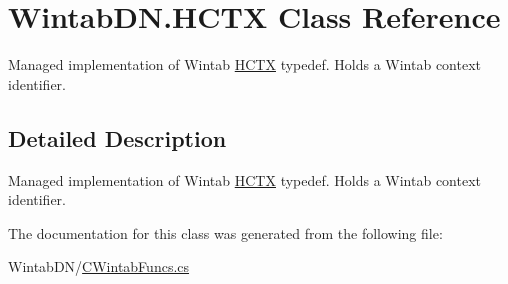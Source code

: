 \hypertarget{class_wintab_d_n_1_1_h_c_t_x}{}\section{Wintab\+D\+N.\+H\+C\+TX Class Reference}
\label{class_wintab_d_n_1_1_h_c_t_x}


Managed implementation of Wintab \mbox{\hyperlink{class_wintab_d_n_1_1_h_c_t_x}{H\+C\+TX}} typedef. Holds a Wintab context identifier.  




\subsection{Detailed Description}
Managed implementation of Wintab \mbox{\hyperlink{class_wintab_d_n_1_1_h_c_t_x}{H\+C\+TX}} typedef. Holds a Wintab context identifier. 



The documentation for this class was generated from the following file\+:\begin{DoxyCompactItemize}
\item 
Wintab\+D\+N/\mbox{\hyperlink{_c_wintab_funcs_8cs}{C\+Wintab\+Funcs.\+cs}}\end{DoxyCompactItemize}
